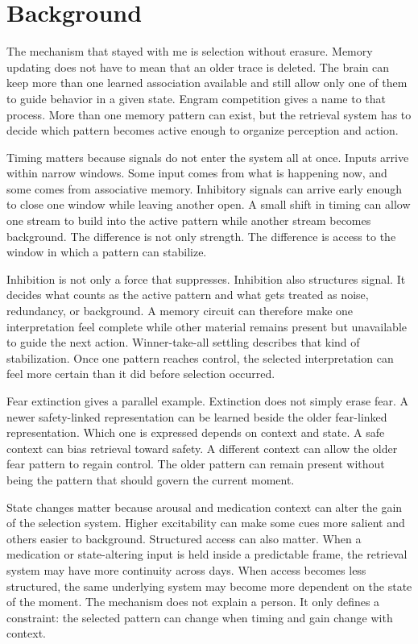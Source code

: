 \section{Background}

The mechanism that stayed with me is selection without erasure. Memory updating does not have to mean that an older trace is deleted. The brain can keep more than one learned association available and still allow only one of them to guide behavior in a given state. Engram competition gives a name to that process. More than one memory pattern can exist, but the retrieval system has to decide which pattern becomes active enough to organize perception and action.

Timing matters because signals do not enter the system all at once. Inputs arrive within narrow windows. Some input comes from what is happening now, and some comes from associative memory. Inhibitory signals can arrive early enough to close one window while leaving another open. A small shift in timing can allow one stream to build into the active pattern while another stream becomes background. The difference is not only strength. The difference is access to the window in which a pattern can stabilize.

Inhibition is not only a force that suppresses. Inhibition also structures signal. It decides what counts as the active pattern and what gets treated as noise, redundancy, or background. A memory circuit can therefore make one interpretation feel complete while other material remains present but unavailable to guide the next action. Winner-take-all settling describes that kind of stabilization. Once one pattern reaches control, the selected interpretation can feel more certain than it did before selection occurred.

Fear extinction gives a parallel example. Extinction does not simply erase fear. A newer safety-linked representation can be learned beside the older fear-linked representation. Which one is expressed depends on context and state. A safe context can bias retrieval toward safety. A different context can allow the older fear pattern to regain control. The older pattern can remain present without being the pattern that should govern the current moment.

State changes matter because arousal and medication context can alter the gain of the selection system. Higher excitability can make some cues more salient and others easier to background. Structured access can also matter. When a medication or state-altering input is held inside a predictable frame, the retrieval system may have more continuity across days. When access becomes less structured, the same underlying system may become more dependent on the state of the moment. The mechanism does not explain a person. It only defines a constraint: the selected pattern can change when timing and gain change with context.

